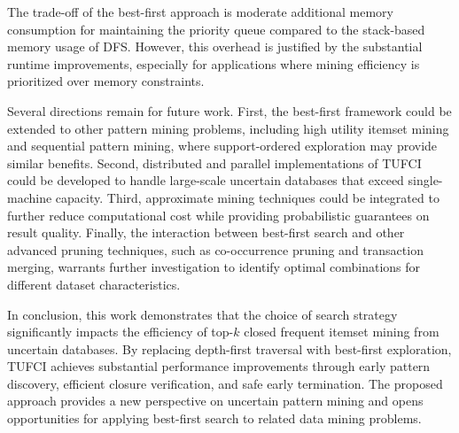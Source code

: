 \documentclass[10pt,letterpaper]{article}
\begin{document}
The trade-off of the best-first approach is moderate additional memory consumption for maintaining the priority queue compared to the stack-based memory usage of DFS. However, this overhead is justified by the substantial runtime improvements, especially for applications where mining efficiency is prioritized over memory constraints.

Several directions remain for future work. First, the best-first framework could be extended to other pattern mining problems, including high utility itemset mining and sequential pattern mining, where support-ordered exploration may provide similar benefits. Second, distributed and parallel implementations of TUFCI could be developed to handle large-scale uncertain databases that exceed single-machine capacity. Third, approximate mining techniques could be integrated to further reduce computational cost while providing probabilistic guarantees on result quality. Finally, the interaction between best-first search and other advanced pruning techniques, such as co-occurrence pruning and transaction merging, warrants further investigation to identify optimal combinations for different dataset characteristics.

In conclusion, this work demonstrates that the choice of search strategy significantly impacts the efficiency of top-$k$ closed frequent itemset mining from uncertain databases. By replacing depth-first traversal with best-first exploration, TUFCI achieves substantial performance improvements through early pattern discovery, efficient closure verification, and safe early termination. The proposed approach provides a new perspective on uncertain pattern mining and opens opportunities for applying best-first search to related data mining problems.
\pagebreak

\end{document}
